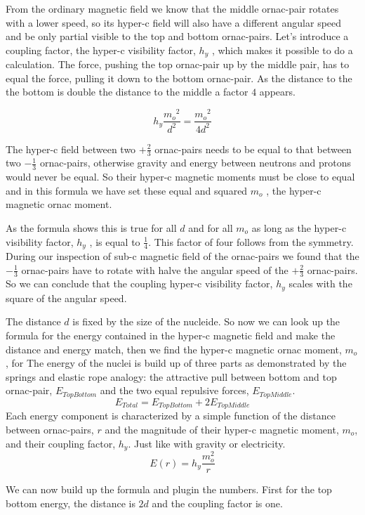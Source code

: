 From the ordinary magnetic field we know that the middle ornac-pair rotates with a lower speed, so its hyper-c field will also have a different angular speed and be only partial visible to the top and bottom ornac-pairs. Let's introduce a coupling factor, the hyper-c visibility factor, $h_y$ , which makes it possible to do a calculation. The force, pushing the top ornac-pair up by the middle pair, has to equal the force, pulling it down to the bottom ornac-pair. As the distance to the the bottom is double the distance to the middle a factor $4$ appears.

$$  h_y \frac{{m_o}^2}{d^2} =   \frac{{m_o}^2}{4 d^2} $$

The hyper-c field between two $+\frac{2}{3}$ ornac-pairs needs to be equal to that between two $-\frac{1}{3}$ ornac-pairs, otherwise gravity and energy between neutrons and protons would never be equal. So their hyper-c magnetic moments must be close to equal and in this formula we have set these equal and squared $m_o$ , the hyper-c magnetic ornac moment.

As the formula shows this is true for all $d$ and for all $m_o$ as long as the hyper-c visibility factor, $h_y$ , is equal to $\frac{1}{4}$. This factor of four follows from the symmetry. During our inspection of sub-c magnetic field of the ornac-pairs we found that the  $-\frac{1}{3}$  ornac-pairs have to rotate with halve the angular speed of the $+\frac{2}{3}$ ornac-pairs. So we can conclude that the coupling hyper-c visibility factor, $h_y$ scales with the square of the angular speed. 

The distance $d$ is fixed by the size of the nucleide. So now we can look up the formula for the energy contained in the hyper-c magnetic field and make the distance and energy match, then we find the hyper-c magnetic ornac moment,  $m_o$, for
The energy of the nuclei is build up of three parts as demonstrated by the springs and elastic rope analogy: the attractive pull between bottom and top ornac-pair, $E_{TopBottom} $ and the two equal repulsive forces, $E_{TopMiddle} $.
$$ E_{Total}=E_{TopBottom} + 2E_{TopMiddle} $$
Each energy component is characterized by a simple function of the distance between ornac-pairs, $r$ and the magnitude of their hyper-c magnetic moment, $m_o$, and their coupling factor, $h_y$. Just like with gravity or electricity.
$$ E(r) = h_y \frac{m_o^2}{r} $$

We can now build up the formula and plugin the numbers. First for the top bottom energy, the distance is $2d$ and the coupling factor is one.

